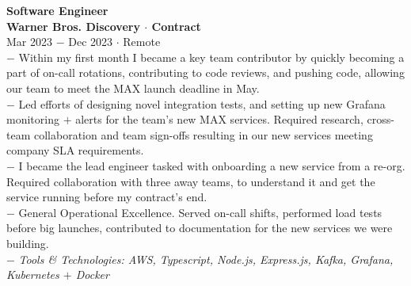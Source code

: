 \documentclass{resume}
\begin{document}
\begin{flushleft}
\normalsize{\bf Software Engineer}\\
\footnotesize{\bf Warner Bros. Discovery $\cdot$ Contract}\\
\footnotesize{Mar 2023 $-$ Dec 2023 $\cdot$ Remote}\\[1mm]
{\scriptsize
	$-$ Within my first month I became a key team contributor by quickly becoming a part of on-call rotations, contributing to code reviews, and pushing code, allowing our team to meet the MAX launch deadline in May.\\
	$-$ Led efforts of designing novel integration tests, and setting up new Grafana monitoring $+$ alerts for the team's new MAX services. Required research, cross-team collaboration and team sign-offs resulting in our new services meeting company SLA requirements.\\
	$-$ I became the lead engineer tasked with onboarding a new service from a re-org. Required collaboration with three away teams, to understand it and get the service running before my contract's end.\\
	$-$ General Operational Excellence. Served on-call shifts, performed load tests before big launches, contributed to documentation for the new services we were building.\\
	$-$ \textit{Tools \& Technologies: AWS, Typescript, Node.js, Express.js, Kafka, Grafana, Kubernetes $+$ Docker}
}\\[3mm]


\end{flushleft}
\end{document}
